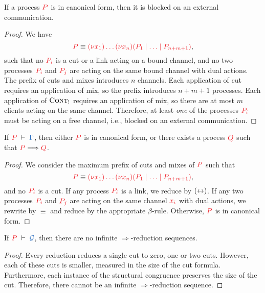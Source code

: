 \documentclass[UKenglish]{llncs}
\begin{document}
\begin{corollary}
  If a process $\tm{P}$ is in canonical form, then it is blocked on an external communication.
\end{corollary}
\begin{proof}
  We have
  \[
  \tm{P} \equiv \tm{\piNew{x_1}{\dots\piNew{x_n}{(P_1 \ppar \dots \ppar P_{n+m+1})}}},
  \]
  such that no $\tm{P_i}$ is a cut or a link acting on a bound channel, and no two processes $\tm{P_i}$ and $\tm{P_j}$ are acting on the same bound channel with dual actions. The prefix of cuts and mixes introduces $n$ channels. Each application of cut requires an application of mix, so the prefix introduces $n+m+1$ processes. Each application of $\textsc{Cont}_{!}$ requires an application of mix, so there are at most $m$ clients acting on the same channel. Therefore, at least \emph{one} of the processes $\tm{P_i}$ must be acting on a free channel, i.e., blocked on an external communication.
\end{proof}
\begin{theorem}[Progress]\label{thm:hcp-progress}
  If $\seq[P]{\Gamma}$, then either $\tm{P}$ is in canonical form, or there exists a process $\tm{Q}$ such that $\tm{P}\Longrightarrow\tm{Q}$.
\end{theorem} 
\begin{proof}
  We consider the maximum prefix of cuts and mixes of $\tm{P}$ such that
  \[
  \tm{P} \equiv \tm{\piNew{x_1}{\dots\piNew{x_n}{(P_1 \ppar \dots \ppar P_{n+m+1})}}},
  \]
  and no $\tm{P_i}$ is a cut. If any process $\tm{P_i}$ is a link, we reduce by $({\leftrightarrow})$. If any two processes $\tm{P_i}$ and $\tm{P_j}$ are acting on the same channel $\tm{x_i}$ with dual actions, we rewrite by $\equiv$ and reduce by the appropriate $\beta$-rule. Otherwise, $\tm{P}$ is in canonical form.
\end{proof}
\begin{theorem}[Termination]\label{thm:hcp-termination}
  If $\seq[P]{\mathcal{G}}$, then there are no infinite $\Longrightarrow$-reduction sequences.
\end{theorem} 
\begin{proof}
  Every reduction reduces a single cut to zero, one or two cuts. However, each of these cuts is smaller, measured in the size of the cut formula. Furthermore, each instance of the structural congruence preserves the size of the cut. Therefore, there cannot be an infinite $\Longrightarrow$-reduction sequence.
\end{proof}
\end{document}
